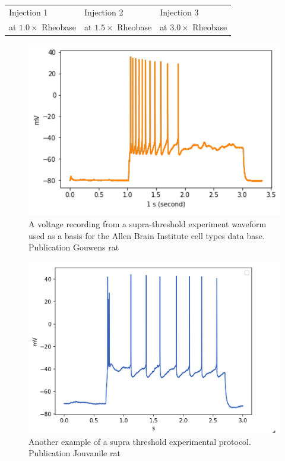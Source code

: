 \begin{tabular}{lll}
{} Injection 1 & Injection 2 & Injection 3 \\
 at $1.0 \times$ Rheobase & at $1.5 \times$ Rheobase & at $3.0 \times$ Rheobase 
\end{tabular}




\begin{figure}
    \begin{center}
    \includegraphics[width=0.6\linewidth]{figures/multi_spiking_large_allen}
    \caption{A voltage recording from a supra-threshold experiment waveform used as a basis for the Allen Brain Institute cell types data base. Publication Gouwens rat \cite{gouwens2018systematic}}
    \label{fig:adaptionm}
    \end{center}
\end{figure}    

\begin{figure}  
    \begin{center}
    \includegraphics[width=0.6\linewidth]{figures/multi_spiking_large_bbp}
    \caption{Another example of a supra threshold experimental protocol. Publication Jouvanile rat \cite{toledo}}
    \label{fig:bbp_trace_adaption_late_spike}
    \end{center}
\end{figure}    

